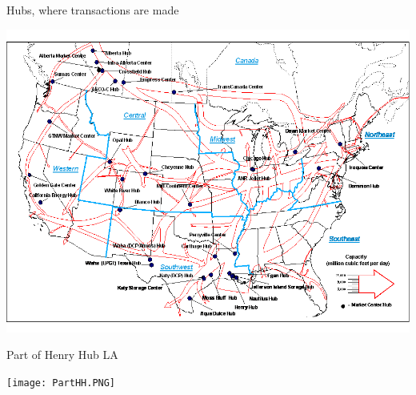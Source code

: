 \documentclass[
  ignorenonframetext,
]{beamer}
\begin{document}
\begin{frame}{Hubs, where transactions are made}
\protect\hypertarget{hubs-where-transactions-are-made}{}

\includegraphics{MarketCenterHubsMap.gif}

\end{frame}

\begin{frame}{Part of Henry Hub LA}
\protect\hypertarget{part-of-henry-hub-la}{}

\texttt{[image: PartHH.PNG]}

\end{frame}
\end{document}
